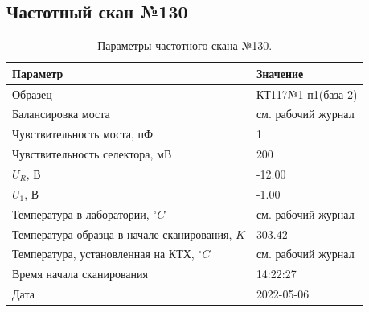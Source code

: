 \subsection{Частотный скан №130}
\begin{table}[!ht]
    \centering
    \caption{Параметры частотного скана №130.}
    \begin{tabular}{|l|l|}
        \hline
        Параметр                                       & Значение                  \\ \hline
        Образец                                        & КТ117№1 п1(база 2)        \\ \hline
        Балансировка моста                             & см. рабочий журнал        \\ \hline
        Чувствительность моста, пФ                     & 1                         \\ \hline
        Чувствительность селектора, мВ                 & 200                       \\ \hline
        $U_R$, В                                       & -12.00                    \\ \hline
        $U_1$, В                                       & -1.00                     \\ \hline
        Температура в лаборатории, $^\circ C$          & см. рабочий журнал        \\ \hline
        Температура образца в начале сканирования, $K$ & 303.42                    \\ \hline
        Температура, установленная на КТХ, $^\circ C$  & см. рабочий журнал        \\ \hline
        Время начала сканирования                      & 14:22:27                  \\ \hline
        Дата                                           & 2022-05-06                \\ \hline
    \end{tabular}
    \label{table:frequency_scan_130}
\end{table}

